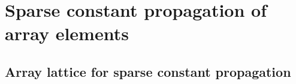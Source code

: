 

\section{Sparse constant propagation of array elements}\label{sec:cp}
\subsection{Array lattice for sparse constant propagation }
\label{sec:arraylattice}



